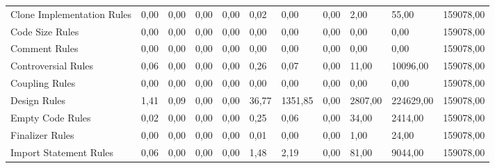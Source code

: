 \begin{table}[H]
{\begin{tabular}{@{}lp{10mm}p{10mm}p{10mm}p{10mm}llllll@{}}
Clone Implementation Rules          & 0,00           & 0,00                    & 0,00             & 0,00          & 0,02                           & 0,00                              & 0,00            & 2,00            & 55,00          & 159078,00       \\
Code Size Rules                     & 0,00           & 0,00                    & 0,00             & 0,00          & 0,00                           & 0,00                              & 0,00            & 0,00            & 0,00           & 159078,00       \\
Comment Rules                       & 0,00           & 0,00                    & 0,00             & 0,00          & 0,00                           & 0,00                              & 0,00            & 0,00            & 0,00           & 159078,00       \\
Controversial Rules                 & 0,06           & 0,00                    & 0,00             & 0,00          & 0,26                           & 0,07                              & 0,00            & 11,00           & 10096,00       & 159078,00       \\
Coupling Rules                      & 0,00           & 0,00                    & 0,00             & 0,00          & 0,00                           & 0,00                              & 0,00            & 0,00            & 0,00           & 159078,00       \\
Design Rules                        & 1,41           & 0,09                    & 0,00             & 0,00          & 36,77                          & 1351,85                           & 0,00            & 2807,00         & 224629,00      & 159078,00       \\
Empty Code Rules                    & 0,02           & 0,00                    & 0,00             & 0,00          & 0,25                           & 0,06                              & 0,00            & 34,00           & 2414,00        & 159078,00       \\
Finalizer Rules                     & 0,00           & 0,00                    & 0,00             & 0,00          & 0,01                           & 0,00                              & 0,00            & 1,00            & 24,00          & 159078,00       \\
Import Statement Rules              & 0,06           & 0,00                    & 0,00             & 0,00          & 1,48                           & 2,19                              & 0,00            & 81,00           & 9044,00        & 159078,00       \\

\end{tabular}}
\end{table}
